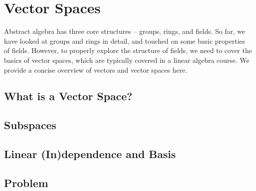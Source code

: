 \chapter{Vector Spaces}
Abstract algebra has three core structures -- groups, rings, and fields. So far, we have looked at groups and rings in detail, and touched on some basic properties of fields. However, to properly explore the structure of fields, we need to cover the basics of vector spaces, which are typically covered in a linear algebra course. We provide a concise overview of vectors and vector spaces here.

\section{What is a Vector Space?}

\section{Subspaces}

\section{Linear (In)dependence and Basis}

\newpage

\section{Problem}
